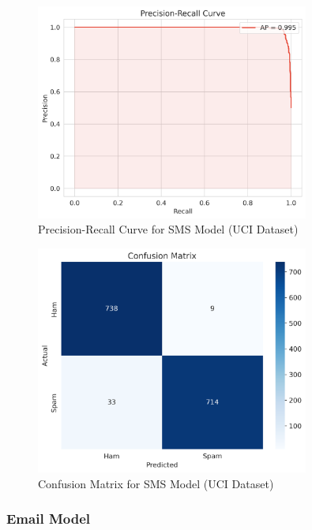 \documentclass{article}
\begin{document}
\begin{figure}[htbp]
    \centering
    \includegraphics[width=0.8\textwidth]{../analysis/sms/randomforest/uci/precision_recall_curve.png}
    \caption{Precision-Recall Curve for SMS Model (UCI Dataset)}
    \label{fig:precision_recall_curve_3}
\end{figure}

\begin{figure}[htbp]
    \centering
    \includegraphics[width=0.8\textwidth]{../analysis/sms/randomforest/uci/confusion_matrix.png}
    \caption{Confusion Matrix for SMS Model (UCI Dataset)}
    \label{fig:confusion_matrix_3}
\end{figure}

\newpage

\subsubsection{Email Model}
\end{document}
